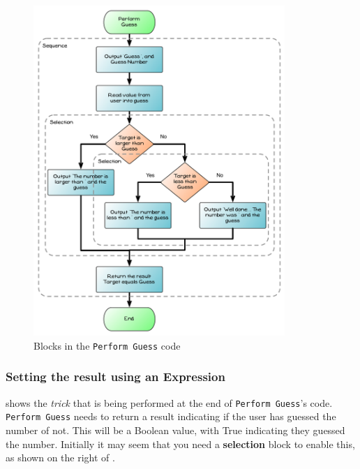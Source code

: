 \begin{figure}[htbp]
   \centering
   \includegraphics[width=0.85\textwidth]{./topics/control-flow/diagrams/PerformGuess7} 
   \caption{Blocks in the \texttt{Perform Guess} code}
   \label{fig:perform-guess-7}
\end{figure}



\clearpage
\subsubsection{Setting the result using an Expression} %
\label{ssub:setting_the_result_using_an_expression}

 shows the \emph{trick} that is being performed at the end of \texttt{Perform Guess}'s code. \texttt{Perform Guess} needs to return a result indicating if the user has guessed the number of not. This will be a Boolean value, with True indicating they guessed the number. Initially it may seem that you need a \textbf{selection} block to enable this, as shown on the right of . 

